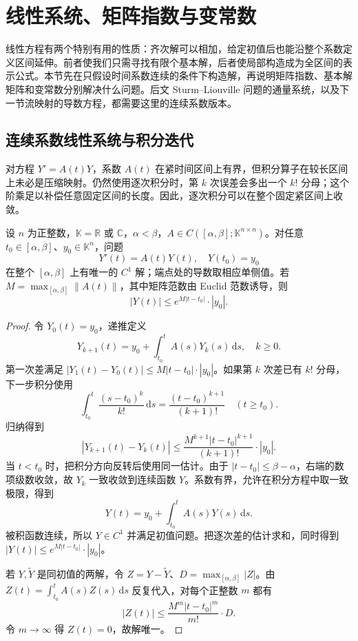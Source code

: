 \section{线性系统、矩阵指数与变常数}
\label{b2:sec:ode-linear-systems}

线性方程有两个特别有用的性质：齐次解可以相加，给定初值后也能沿整个系数定义区间延伸。前者使我们只需寻找有限个基本解，后者使局部构造成为全区间的表示公式。本节先在只假设时间系数连续的条件下构造解，再说明矩阵指数、基本解矩阵和变常数分别解决什么问题。后文 Sturm--Liouville 问题的通量系统，以及下一节流映射的导数方程，都需要这里的连续系数版本。

\subsection{连续系数线性系统与积分迭代}
\label{b2:subsec:070205}

对方程 \(Y'=A(t)Y\)，系数 \(A(t)\) 在紧时间区间上有界，但积分算子在较长区间上未必是压缩映射。仍然使用逐次积分时，第 \(k\) 次误差会多出一个 \(k!\) 分母；这个阶乘足以补偿任意固定区间的长度。因此，逐次积分可以在整个固定紧区间上收敛。

\begin{proposition}\label{b2:prop:ode-continuous-linear}
设 \(n\) 为正整数，\(\mathbb K=\mathbb R\) 或 \(\mathbb C\)，\(\alpha<\beta\)，\(A\in C([\alpha,\beta];\mathbb K^{n\times n})\)。对任意 \(t_0\in[\alpha,\beta]\)、\(y_0\in\mathbb K^n\)，问题
\[
 Y'(t)=A(t)Y(t),\quad Y(t_0)=y_0
\]
在整个 \([\alpha,\beta]\) 上有唯一的 \(C^1\) 解；端点处的导数取相应单侧值。若 \(M=\max_{[\alpha,\beta]}\|A(t)\|\)，其中矩阵范数由 Euclid 范数诱导，则
\[
 |Y(t)|\leq e^{M|t-t_0|}\cdot|y_0|.
\]
\end{proposition}
\begin{proof}
令 \(Y_0(t)=y_0\)，递推定义
\[
 Y_{k+1}(t)=y_0+\int_{t_0}^t A(s)Y_k(s)\,\mathrm ds,
 \quad k\geq0.
\]
第一次差满足 \(|Y_1(t)-Y_0(t)|\leq M|t-t_0|\cdot|y_0|\)。如果第 \(k\) 次差已有 \(k!\) 分母，下一步积分使用
\[
 \int_{t_0}^{t}\frac{(s-t_0)^k}{k!}\,\mathrm ds
 =\frac{(t-t_0)^{k+1}}{(k+1)!}\quad(t\geq t_0).
\]
归纳得到
\[
 |Y_{k+1}(t)-Y_k(t)|
 \leq\frac{M^{k+1}|t-t_0|^{k+1}}{(k+1)!}\cdot|y_0|.
\]
当 \(t<t_0\) 时，把积分方向反转后使用同一估计。由于 \(|t-t_0|\leq\beta-\alpha\)，右端的数项级数收敛，故 \(Y_k\) 一致收敛到连续函数 \(Y\)。系数有界，允许在积分方程中取一致极限，得到
\[
 Y(t)=y_0+\int_{t_0}^t A(s)Y(s)\,\mathrm ds.
\]
被积函数连续，所以 \(Y\in C^1\) 并满足初值问题。把逐次差的估计求和，同时得到 \(|Y(t)|\leq e^{M|t-t_0|}\cdot|y_0|\)。

若 \(Y,\widetilde Y\) 是同初值的两解，令 \(Z=Y-\widetilde Y\)、\(D=\max_{[\alpha,\beta]}|Z|\)。由 \(Z(t)=\int_{t_0}^t A(s)Z(s)\,\mathrm ds\) 反复代入，对每个正整数 \(m\) 都有
\[
 |Z(t)|\leq\frac{M^m|t-t_0|^m}{m!}\cdot D.
\]
令 \(m\to\infty\) 得 \(Z(t)=0\)，故解唯一。
\end{proof}

